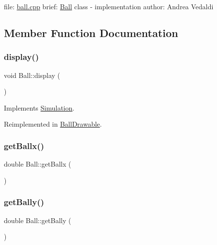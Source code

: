 file\+: \hyperlink{ball_8cpp}{ball.\+cpp} brief\+: \hyperlink{classBall}{Ball} class -\/ implementation author\+: Andrea Vedaldi 

\subsection{Member Function Documentation}
\mbox{\label{classBall_a4a575db97fe36b3caa001ade4affeb18}} 
\subsubsection{\texorpdfstring{display()}{display()}}
{\footnotesize\ttfamily void Ball\+::display (\begin{DoxyParamCaption}{ }\end{DoxyParamCaption})\hspace{0.3cm}{\ttfamily [virtual]}}



Implements \hyperlink{classSimulation_a6f8e5272dbb5dea34970f0695419ff03}{Simulation}.



Reimplemented in \hyperlink{classBallDrawable_a934809e648474de989666d41a34a880e}{Ball\+Drawable}.

\mbox{\label{classBall_a683551ec9c891d1420a1aab806bfef43}} 
\subsubsection{\texorpdfstring{get\+Ballx()}{getBallx()}}
{\footnotesize\ttfamily double Ball\+::get\+Ballx (\begin{DoxyParamCaption}{ }\end{DoxyParamCaption})}

\mbox{\label{classBall_ae0b2224e6fbc8897ce132b229ceab446}} 
\subsubsection{\texorpdfstring{get\+Bally()}{getBally()}}
{\footnotesize\ttfamily double Ball\+::get\+Bally (\begin{DoxyParamCaption}{ }\end{DoxyParamCaption})}

